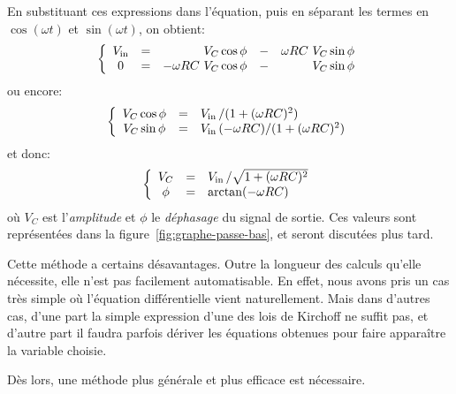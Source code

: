 En substituant ces expressions dans l'équation,
puis en séparant les termes en $\cos(\omega t)$ et $\sin(\omega t)$,
on obtient:
\begin{equation}
    \left\{
        \begin{array}{ccrcr}
            V\ind{in} &=& V_C\cos\phi &-& \omega RC\ V_C\sin\phi \\
            0 &=& -\omega RC\ V_C\cos\phi &-& V_C\sin\phi
        \end{array}
    \right.
\end{equation}
ou encore:
\begin{equation}
    \left\{
        \begin{array}{ccl}
            V_C\cos\phi &=& V_{\mathrm{in}}\,/(1+(\omega RC)^2) \\
            V_C\sin\phi &=& V_{\mathrm{in}}\,(-\omega RC) / (1+(\omega RC)^2)
        \end{array}
    \right.
\end{equation}
et donc:
\begin{equation}
    \left\{
        \begin{array}{ccl}
            V_C &=& V_{\mathrm{in}}\,/ \sqrt{1+(\omega RC)^2} \\
            \phi &=& \arctan(-\omega RC)
        \end{array}
    \right.
\end{equation}
où $V_C$ est l'\emph{amplitude} et $\phi$ le \emph{déphasage}
du signal de sortie.
Ces valeurs sont représentées dans la figure~\ref{fig:graphe-passe-bas},
et seront discutées plus tard.

Cette méthode a certains désavantages.
Outre la longueur des calculs qu'elle nécessite,
elle n'est pas facilement automatisable.
En effet, nous avons pris un cas très simple où l'équation différentielle
vient naturellement.
Mais dans d'autres cas,
d'une part la simple expression d'une
des lois de Kirchoff ne suffit pas,
et d'autre part il faudra parfois dériver les équations
obtenues pour faire apparaître la variable choisie.

Dès lors, une méthode plus générale et plus efficace est nécessaire.

